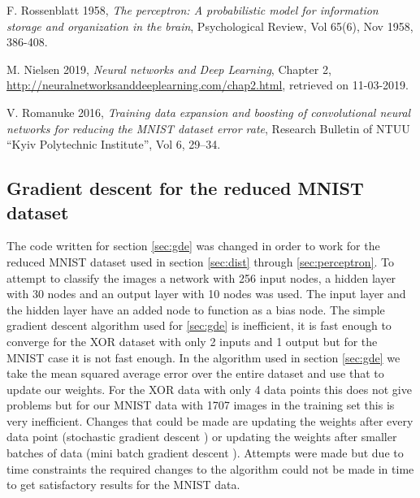 \documentclass[10 pt, a4paper]{article}
\begin{document}
\begin{thebibliography}{99}
 F. Rossenblatt 1958, \textit{The perceptron: A probabilistic model for information storage and organization in the brain}, Psychological Review, Vol 65(6), Nov 1958, 386-408.

 M. Nielsen 2019, \textit{Neural networks and Deep Learning}, Chapter 2, \url{http://neuralnetworksanddeeplearning.com/chap2.html}, retrieved on 11-03-2019.

 V. Romanuke 2016, \textit{Training data expansion and boosting of convolutional neural networks for reducing the MNIST dataset error rate},  Research Bulletin of NTUU “Kyiv Polytechnic Institute”, Vol 6, 29–34. 

\end{thebibliography}

\begin{appendices}
\section{Gradient descent for the reduced MNIST dataset} \label{sec:mnistgde}

The code written for section \ref{sec:gde} was changed in order to work for the reduced MNIST dataset used in section \ref{sec:dist} through \ref{sec:perceptron}. To attempt to classify the images a network with 256 input nodes, a hidden layer with 30 nodes and an output layer with 10 nodes was used. The input layer and the hidden layer have an added node to function as a bias node. The simple gradient descent algorithm used for \ref{sec:gde} is inefficient, it is fast enough to converge for the XOR dataset with only 2 inputs and 1 output but for the MNIST case it is not fast enough. In the algorithm used in section \ref{sec:gde} we take the mean squared average error over the entire dataset and use that to update our weights. For the XOR data with only 4 data points this does not give problems but for our MNIST data with 1707 images in the training set this is very inefficient. Changes that could be made are updating the weights after every data point (stochastic gradient descent \cite{neural}) or updating the weights after smaller batches of data (mini batch gradient descent \cite{neural}). Attempts were made but due to time constraints the required changes to the algorithm could not be made in time to get satisfactory results for the MNIST data.

\end{appendices}
\end{document}
